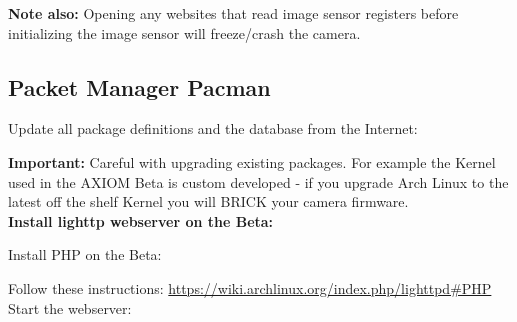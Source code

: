 \textbf{Note also:} Opening any websites that read image sensor registers before initializing the image sensor  will freeze/crash the camera. 







\subsection{Packet Manager Pacman}

Update all package definitions and the database from the Internet: 


\textbf{Important:} Careful with upgrading existing packages. For example the Kernel used in the AXIOM Beta is custom developed - if you upgrade Arch Linux to the latest off the shelf Kernel you will BRICK your camera firmware.\\

\textbf{Install lighttp webserver on the Beta: }


Install PHP on the Beta: 


Follow these instructions: \href{https://wiki.archlinux.org/index.php/lighttpd#PHP}{https://wiki.archlinux.org/index.php/lighttpd#PHP}\\

Start the webserver: 

